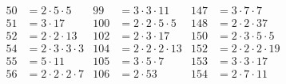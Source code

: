 \begin{align*}
  50&=2\cdot5\cdot5             &  99&=3\cdot3\cdot11                  & 147&=3\cdot7\cdot7                         \\
  51&=3\cdot17                  & 100&=2\cdot2\cdot5\cdot5             & 148&=2\cdot2\cdot37                        \\
  52&=2\cdot2\cdot13            & 102&=2\cdot3\cdot17                  & 150&=2\cdot3\cdot5\cdot5                   \\
  54&=2\cdot3\cdot3\cdot3       & 104&=2\cdot2\cdot2\cdot13            & 152&=2\cdot2\cdot2\cdot19                  \\
  55&=5\cdot11                  & 105&=3\cdot5\cdot7                   & 153&=3\cdot3\cdot17                        \\
  56&=2\cdot2\cdot2\cdot7       & 106&=2\cdot53                        & 154&=2\cdot7\cdot11                       
\end{align*}

